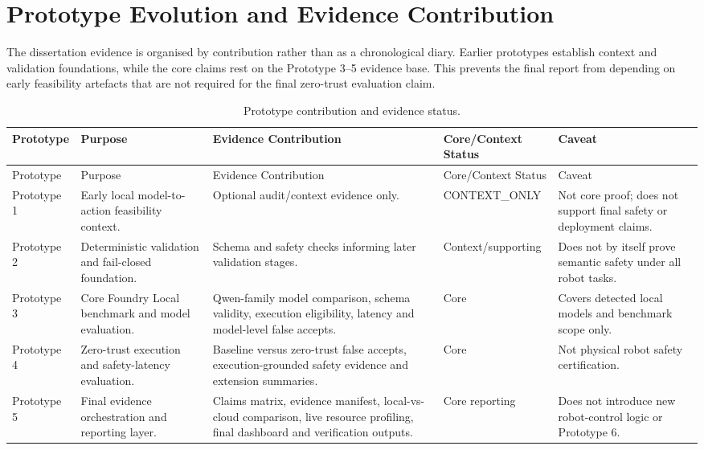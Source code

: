 \section{Prototype Evolution and Evidence Contribution}
\label{sec:prototype_evolution}

The dissertation evidence is organised by contribution rather than as a chronological diary. Earlier prototypes establish context and validation foundations, while the core claims rest on the Prototype 3--5 evidence base. This prevents the final report from depending on early feasibility artefacts that are not required for the final zero-trust evaluation claim.

\begin{longtable}{p{}p{}p{}p{}p{}}
        \caption{Prototype contribution and evidence status.}
        \label{tab:prototype_contribution}\\
        \toprule
        Prototype & Purpose & Evidence Contribution & Core/Context Status & Caveat \\
        \midrule
        \endfirsthead
        \toprule
        Prototype & Purpose & Evidence Contribution & Core/Context Status & Caveat \\
        \midrule
        \endhead
        Prototype 1 & Early local model-to-action feasibility context. & Optional audit/context evidence only. & CONTEXT\_ONLY & Not core proof; does not support final safety or deployment claims. \\
Prototype 2 & Deterministic validation and fail-closed foundation. & Schema and safety checks informing later validation stages. & Context/supporting & Does not by itself prove semantic safety under all robot tasks. \\
Prototype 3 & Core Foundry Local benchmark and model evaluation. & Qwen-family model comparison, schema validity, execution eligibility, latency and model-level false accepts. & Core & Covers detected local models and benchmark scope only. \\
Prototype 4 & Zero-trust execution and safety-latency evaluation. & Baseline versus zero-trust false accepts, execution-grounded safety evidence and extension summaries. & Core & Not physical robot safety certification. \\
Prototype 5 & Final evidence orchestration and reporting layer. & Claims matrix, evidence manifest, local-vs-cloud comparison, live resource profiling, final dashboard and verification outputs. & Core reporting & Does not introduce new robot-control logic or Prototype 6. \\
        \bottomrule
        \end{longtable}
